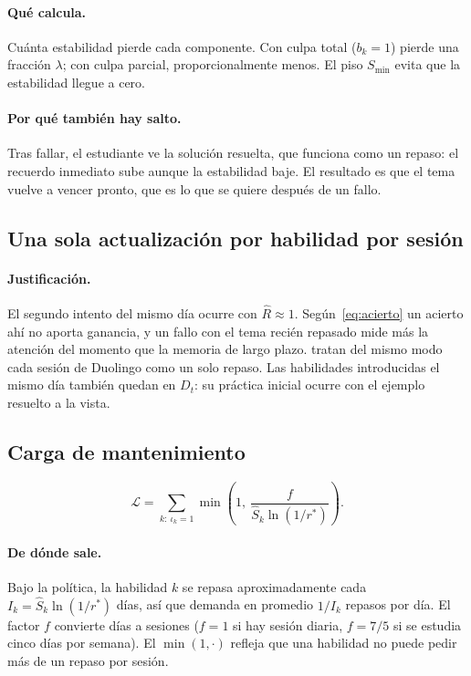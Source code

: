 \documentclass[11pt]{article}
\theoremstyle{definition}
\theoremstyle{remark}
\newcommand{\Rh}{\hat R}
\newcommand{\Sh}{\hat S}
\newcommand{\rstar}{r^{\ast}}
\newcommand{\Smin}{S_{\min}}
\newcommand{\Carga}{\mathcal L}
\begin{document}
\paragraph{Qué calcula.} Cuánta estabilidad pierde cada componente. Con culpa total ($b_k=1$) pierde una fracción $\lambda$; con culpa parcial, proporcionalmente menos. El piso $\Smin$ evita que la estabilidad llegue a cero.

\paragraph{Por qué también hay salto.} Tras fallar, el estudiante ve la solución resuelta, que funciona como un repaso: el recuerdo inmediato sube aunque la estabilidad baje. El resultado es que el tema vuelve a vencer pronto, que es lo que se quiere después de un fallo.

\subsection{Una sola actualización por habilidad por sesión}

\paragraph{Justificación.} El segundo intento del mismo día ocurre con $\Rh\approx1$. Según~\eqref{eq:acierto} un acierto ahí no aporta ganancia, y un fallo con el tema recién repasado mide más la atención del momento que la memoria de largo plazo. \citet{tabibian2019} tratan del mismo modo cada sesión de Duolingo como un solo repaso. Las habilidades introducidas el mismo día también quedan en $D_t$: su práctica inicial ocurre con el ejemplo resuelto a la vista.

\subsection{Carga de mantenimiento}
\label{sec:admision}

\begin{equation}
\Carga=\sum_{k:\ \iota_k=1}\min\!\left(1,\ \frac{f}{\Sh_k\ln(1/\rstar)}\right).
\label{eq:carga}
\end{equation}

\paragraph{De dónde sale.} Bajo la política, la habilidad $k$ se repasa aproximadamente cada $I_k=\Sh_k\ln(1/\rstar)$ días, así que demanda en promedio $1/I_k$ repasos por día. El factor $f$ convierte días a sesiones ($f=1$ si hay sesión diaria, $f=7/5$ si se estudia cinco días por semana). El $\min(1,\cdot)$ refleja que una habilidad no puede pedir más de un repaso por sesión.
\end{document}
